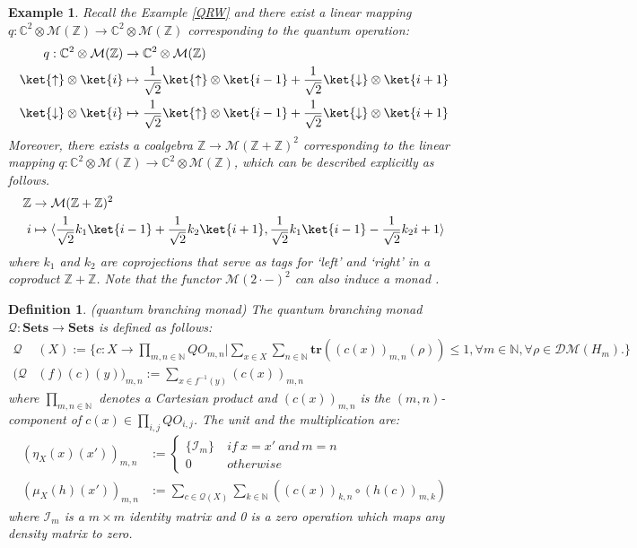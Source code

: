 \documentclass[a4paper, 11pt]{article}
\newtheorem{definition}{Definition}
\newtheorem{example}{Example}
\newcommand{\roothalf}{\frac{1}{\sqrt{2}}}
\begin{document}
\begin{example}
Recall the Example \ref{QRW} and there exist a linear mapping $q:\mathbb{C}^2\otimes\mathcal{M}(\mathbb{Z})\rightarrow \mathbb{C}^2\otimes\mathcal{M}(\mathbb{Z})$ corresponding to the quantum operation:
$$
\begin{aligned}
q:\mathbb{C}^2\otimes\mathcal{M}(\mathbb{Z})&\rightarrow \mathbb{C}^2\otimes\mathcal{M}(\mathbb{Z})\\
\ket{\uparrow}\otimes \ket{i}&\mapsto\roothalf\ket{\uparrow}\otimes\ket{i-1}+\roothalf\ket{\downarrow}\otimes\ket{i+1}\\
\ket{\downarrow}\otimes \ket{i}&\mapsto\roothalf\ket{\uparrow}\otimes\ket{i-1}+\roothalf\ket{\downarrow}\otimes\ket{i+1}
\end{aligned}
$$
Moreover, there exists a coalgebra $\mathbb{Z}\rightarrow \mathcal{M}(\mathbb{Z}+\mathbb{Z})^2$ corresponding to the linear mapping $q:\mathbb{C}^2\otimes\mathcal{M}(\mathbb{Z})\rightarrow \mathbb{C}^2\otimes\mathcal{M}(\mathbb{Z})$, which can be described explicitly as follows. 
$$
\begin{aligned}
\mathbb{Z}&\rightarrow \mathcal{M}(\mathbb{Z}+\mathbb{Z})^2\\
i&\mapsto \langle\roothalf k_1\ket{i-1}+\roothalf k_2\ket{i+1},\roothalf k_1\ket{i-1}-\roothalf k_2{i+1}\rangle
\end{aligned}
$$
where $k_1$ and $k_2$ are coprojections that serve as tags for `left' and `right' in a coproduct $\mathbb{Z}+\mathbb{Z}$. Note that the functor $\mathcal{M}(2\cdot -)^2$ can also induce a monad \cite{B11}. 
\end{example}

\begin{definition}(quantum branching monad)
The quantum branching monad $\mathcal{Q}:\textbf{Sets}\rightarrow \textbf{Sets}$ is defined as follows:
$$
\begin{aligned}
\mathcal{Q}&(X):=\{c:X\rightarrow\prod_{m,n\in\mathbb{N}}QO_{m,n}|\sum_{x\in X}\sum_{n\in\mathbb{N}}\mathbf{tr}((c(x))_{m,n}(\rho))\leq 1,\forall m\in \mathbb{N},\forall\rho\in\mathcal{DM}(H_m).\}\\
(\mathcal{Q}&(f)(c)(y))_{m,n}:=\sum_{x\in f^{-1}(y)}(c(x))_{m,n}
\end{aligned}
$$
where $\prod_{m,n\in\mathbb{N}}$ denotes a Cartesian product and $(c(x))_{m,n}$ is the $(m,n)$-component of $c(x)\in\prod_{i,j}QO_{i,j}$. 
The unit and the multiplication are:
$$
\begin{aligned}
(\eta_X(x)(x'))_{m,n}&:=\begin{cases} \{\mathcal{I}_m\} & \ if\ x=x'\ and\ m=n\\ 0 &\ otherwise \end{cases}\\
(\mu_X(h)(x'))_{m,n}&:=\sum_{c\in\mathcal{Q}(X)}\sum_{k\in\mathbb{N}}((c(x))_{k,n}\circ(h(c))_{m,k})
\end{aligned}
$$
where $\mathcal{I}_m$ is a $m\times m$ identity matrix and 0 is a zero operation which maps any density matrix to zero.
\end{definition}
\end{document}
